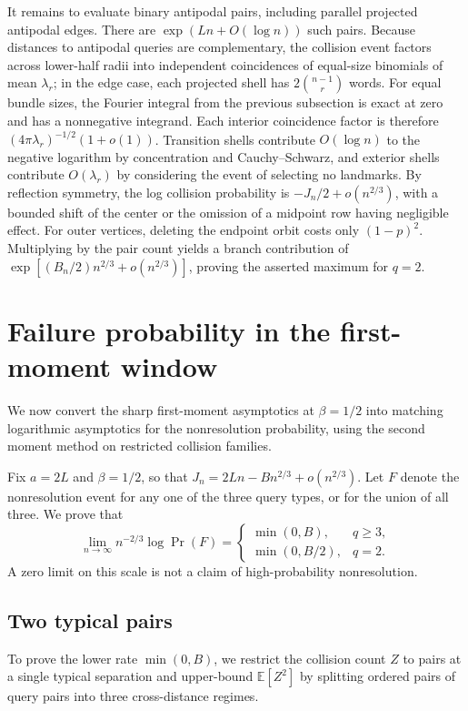 It remains to evaluate binary antipodal pairs, including parallel projected antipodal edges. There are $\exp(Ln+O(\log n))$ such pairs. Because distances to antipodal queries are complementary, the collision event factors across lower-half radii into independent coincidences of equal-size binomials of mean $\lambda_r$; in the edge case, each projected shell has $2\binom{n-1}{r}$ words. For equal bundle sizes, the Fourier integral from the previous subsection is exact at zero and has a nonnegative integrand. Each interior coincidence factor is therefore $(4\pi\lambda_r)^{-1/2}(1+o(1))$. Transition shells contribute $O(\log n)$ to the negative logarithm by concentration and Cauchy--Schwarz, and exterior shells contribute $O(\lambda_r)$ by considering the event of selecting no landmarks. By reflection symmetry, the log collision probability is $-J_n/2+o(n^{2/3})$, with a bounded shift of the center or the omission of a midpoint row having negligible effect. For outer vertices, deleting the endpoint orbit costs only $(1-p)^2$. Multiplying by the pair count yields a branch contribution of $\exp[(B_n/2)n^{2/3}+o(n^{2/3})]$, proving the asserted maximum for $q=2$.

\section{Failure probability in the first-moment window}
We now convert the sharp first-moment asymptotics at $\beta=1/2$ into matching logarithmic asymptotics for the nonresolution probability, using the second moment method on restricted collision families.

Fix $a=2L$ and $\beta=1/2$, so that $J_n=2Ln-Bn^{2/3}+o(n^{2/3})$. Let $F$ denote the nonresolution event for any one of the three query types, or for the union of all three. We prove that
\[
 \lim_{n\to\infty} n^{-2/3}\log\Pr(F)=
 \begin{cases}\min(0,B),&q\ge3,\\ \min(0,B/2),&q=2.\end{cases}
\]
A zero limit on this scale is not a claim of high-probability nonresolution.

\subsection{Two typical pairs}
To prove the lower rate $\min(0,B)$, we restrict the collision count $Z$ to pairs at a single typical separation and upper-bound $\mathbb E[Z^2]$ by splitting ordered pairs of query pairs into three cross-distance regimes.


